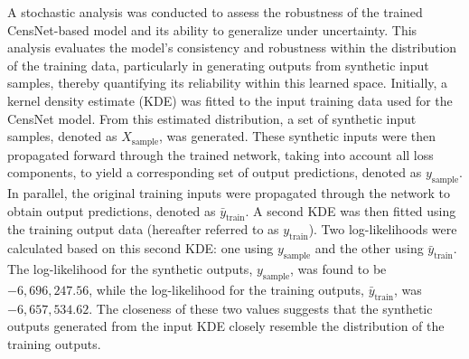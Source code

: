 %
%



A stochastic analysis was conducted to assess the robustness of the trained CensNet-based model and its ability to generalize under uncertainty. This analysis evaluates the model’s consistency and robustness within the distribution of the training data, particularly in generating outputs from synthetic input samples, thereby quantifying its reliability within this learned space. Initially, a kernel density estimate (KDE) was fitted to the input training data used for the CensNet model. From this estimated distribution, a set of synthetic input samples, denoted as \( X_{\text{sample}} \), was generated. These synthetic inputs were then propagated forward through the trained network, taking into account all loss components, to yield a corresponding set of output predictions, denoted as \( y_{\text{sample}} \). In parallel, the original training inputs were propagated through the network to obtain output predictions, denoted as \(\bar{y}_{\text{train}}\). A second KDE was then fitted using the training output data (hereafter referred to as \(y_{\text{train}}\)). Two log-likelihoods were calculated based on this second KDE: one using \(y_{\text{sample}}\) and the other using \(\bar{y}_{\text{train}}\). The log-likelihood for the synthetic outputs, \(y_{\text{sample}}\), was found to be \(-6,696,247.56\), while the log-likelihood for the training outputs, \(\bar{y}_{\text{train}}\), was \(-6,657,534.62\). The closeness of these two values suggests that the synthetic outputs generated from the input KDE closely resemble the distribution of the training outputs.

